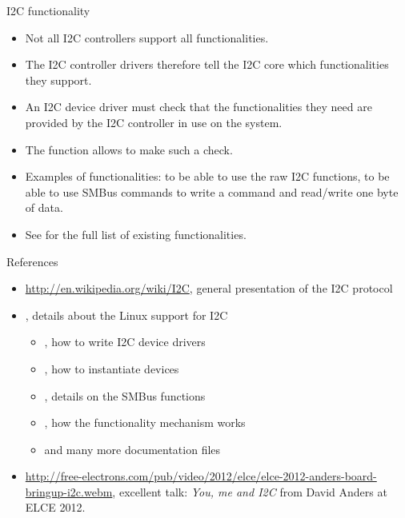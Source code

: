 \begin{frame}{I2C functionality}
  \begin{itemize}
  \item Not all I2C controllers support all functionalities.
  \item The I2C controller drivers therefore tell the I2C core which
    functionalities they support.
  \item An I2C device driver must check that the functionalities they
    need are provided by the I2C controller in use on the system.
  \item The  function allows to make
    such a check.
  \item Examples of functionalities:  to be able to
    use the raw I2C functions,  to be
    able to use SMBus commands to write a command and read/write one
    byte of data.
  \item See  for the full list of
    existing functionalities.
  \end{itemize}
\end{frame}

\begin{frame}{References}
  \begin{itemize}
  \item \url{http://en.wikipedia.org/wiki/I2C}, general presentation
    of the I2C protocol
  \item {}, details about the Linux support for I2C
    \begin{itemize}
    \item {}, how to write I2C device drivers
    \item {}, how to instantiate devices
    \item {}, details on the SMBus functions
    \item {}, how the functionality mechanism works
    \item and many more documentation files
    \end{itemize}
  \item
    \url{http://free-electrons.com/pub/video/2012/elce/elce-2012-anders-board-bringup-i2c.webm},
    excellent talk: {\em You, me and I2C} from David Anders at ELCE
    2012.
  \end{itemize}
\end{frame}
